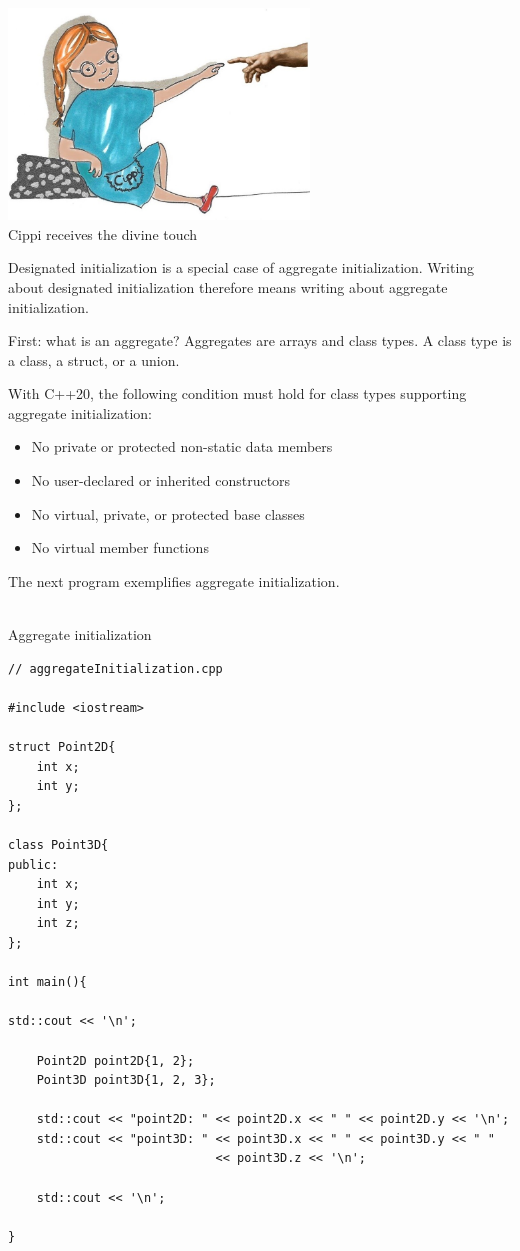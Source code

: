 
\begin{center}
\includegraphics[width=0.6\textwidth]{content/3/chapter4/images/31.png}\\
Cippi receives the divine touch
\end{center}

Designated initialization is a special case of aggregate initialization. Writing about designated initialization therefore means writing about aggregate initialization.


First: what is an aggregate? Aggregates are arrays and class types. A class type is a class, a struct, or a union.

With C++20, the following condition must hold for class types supporting aggregate initialization:

\begin{itemize}
\item 
No private or protected non-static data members

\item 
No user-declared or inherited constructors

\item 
No virtual, private, or protected base classes

\item 
No virtual member functions
\end{itemize}

The next program exemplifies aggregate initialization.

\hspace*{\fill} \\ %
\noindent
Aggregate initialization
\begin{lstlisting}[style=styleCXX]
// aggregateInitialization.cpp

#include <iostream>

struct Point2D{
	int x;
	int y;
};

class Point3D{
public:
	int x;
	int y;
	int z;
};

int main(){

std::cout << '\n';

	Point2D point2D{1, 2};
	Point3D point3D{1, 2, 3};
	
	std::cout << "point2D: " << point2D.x << " " << point2D.y << '\n';
	std::cout << "point3D: " << point3D.x << " " << point3D.y << " "
							 << point3D.z << '\n';
	
	std::cout << '\n';

}
\end{lstlisting}

